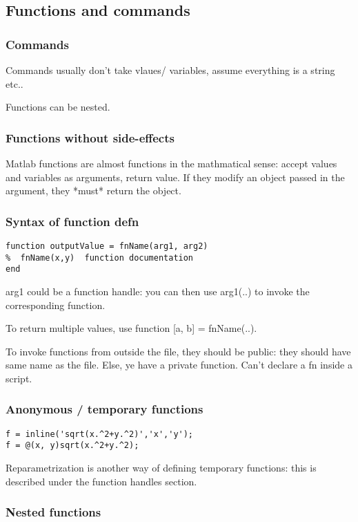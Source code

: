 \documentclass[oneside, article]{memoir}
\begin{document}
\subsection{Functions and commands}
\subsubsection{Commands}
Commands usually don't take vlaues/ variables, assume everything is a string etc..

Functions can be nested.

\subsubsection{Functions without side-effects}
Matlab functions are almost functions in the mathmatical sense: accept values and variables as arguments, return value. If they modify an object passed in the argument, they *must* return the object.

\subsubsection{Syntax of function defn}
\begin{verbatim}
function outputValue = fnName(arg1, arg2)
%  fnName(x,y)  function documentation
end

\end{verbatim}

arg1 could be a function handle: you can then use arg1(..) to invoke the corresponding function.

To return multiple values, use function [a, b] = fnName(..).

To invoke functions from outside the file, they should be public: they should have same name as the file. Else, ye have a private function. Can't declare a fn inside a script.

\subsubsection{Anonymous / temporary functions}
\begin{lstlisting}
f = inline('sqrt(x.^2+y.^2)','x','y');
f = @(x, y)sqrt(x.^2+y.^2);
\end{lstlisting}

Reparametrization is another way of defining temporary functions: this is described under the function handles section.

\subsubsection{Nested functions}
\end{document}
